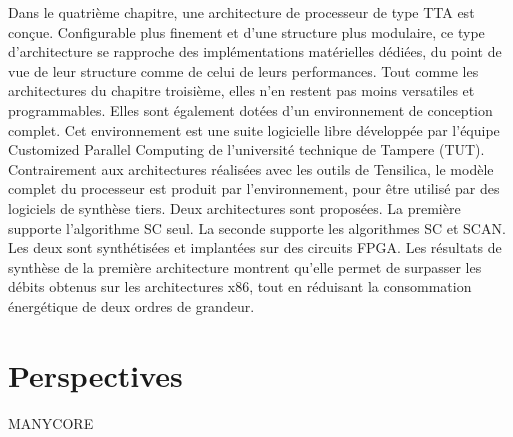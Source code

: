 Dans le quatrième chapitre, une architecture de processeur de type TTA est conçue. Configurable plus finement et d'une structure plus modulaire, ce type d'architecture se rapproche des implémentations matérielles dédiées, du point de vue de leur structure comme de celui de leurs performances. Tout comme les architectures du chapitre troisième, elles n'en restent pas moins versatiles et programmables. Elles sont également dotées d'un environnement de conception complet. Cet environnement est une suite logicielle libre développée par l'équipe \og Customized Parallel Computing \fg de l'université technique de Tampere (TUT). Contrairement aux architectures réalisées avec les outils de Tensilica, le modèle complet du processeur est produit par l'environnement, pour être utilisé par des logiciels de synthèse tiers. Deux architectures sont proposées. La première supporte l'algorithme SC seul. La seconde supporte les algorithmes SC et SCAN. Les deux sont synthétisées et implantées sur des circuits FPGA. Les résultats de synthèse de la première architecture montrent qu'elle permet de surpasser les débits obtenus sur les architectures x86, tout en réduisant la consommation énergétique de deux ordres de grandeur.

\section*{Perspectives}

MANYCORE
